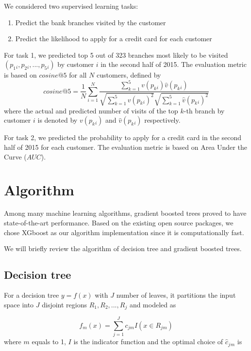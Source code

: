 \documentclass[a4paper]{llncs}
\begin{document}
We considered two supervised learning tasks:

\begin{enumerate}
    \item Predict the bank branches visited by the customer
    \item Predict the likelihood to apply for a credit card for each customer
\end{enumerate}

For task 1, we predicted top 5 out of 323 branches most likely to be visited $(p_1{}_i, p_2{}_i, ..., p_5{}_i)$ by customer $i$ in the second half of 2015.
The evaluation metric is based on $cosine@5$ for all $N$ customers, defined by
\begin{equation}
cosine@5 = \frac{1}{N} \sum_{i=1}^{N} \frac{\sum_{k=1}^{5} v(p_k{}_i)\hat{v}(p_k{}_i)}{\sqrt{\sum_{k=1}^{5} v(p_k{}_i)^2} \sqrt{\sum_{k=1}^{5} \hat{v}(p_k{}_i)^2}}
\end{equation}
where the actual and predicted number of visits of the top $k$-th branch by customer $i$ is denoted by $v(p_k{}_i)$ and $\hat{v}(p_k{}_i)$ respectively.

For task 2, we predicted the probability to apply for a credit card in the second half of 2015 for each customer.
 The evaluation metric is based on Area Under the Curve ($AUC$).


\section{Algorithm}
Among many machine learning algorithms, gradient boosted trees proved to have state-of-the-art performance. Based on the existing
 open source packages, we chose XGboost \cite{xgboost} as our algorithm implementation since it is computationally fast.

We will briefly review the algorithm of decision tree and gradient boosted trees.

\subsection{Decision tree}
For a decision tree $y=f(x)$ with $J$ number of leaves,
 it partitions the input space into $J$ disjoint regions $R_1, R_2, ..., R_j$ and modeled as

\begin{equation}
f_m(x) = \sum_{j = 1}^J c_{jm} I(x \in R_{jm})
\end{equation}
where $m$ equals to 1, $I$ is the indicator function and the optimal choice of $\hat c_j{}_m$ is
\end{document}

